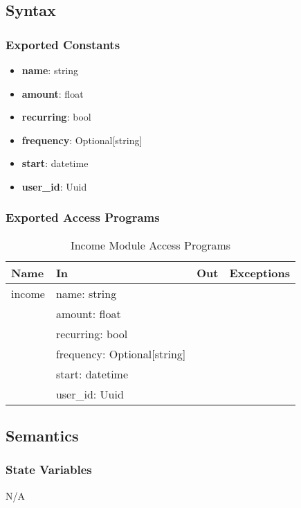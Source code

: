 \documentclass[12pt, titlepage]{article}
\begin{document}
\subsection{Syntax}

\subsubsection{Exported Constants}
\begin{itemize}
  \item \textbf{name}: string
  \item \textbf{amount}: float
  \item \textbf{recurring}: bool
  \item \textbf{frequency}: Optional[string]
  \item \textbf{start}: datetime
  \item \textbf{user\_id}: Uuid
\end{itemize}

\subsubsection{Exported Access Programs}

\begin{center}
  \begin{table}[H]
    \caption{Income Module Access Programs}
\begin{tabular}{p{4cm} p{4cm} p{4cm} p{4cm}}
\hline
\textbf{Name} & \textbf{In} & \textbf{Out} & \textbf{Exceptions} \\
\hline
income & name: string &  &  \\
  & amount: float &  &  \\
  & recurring: bool &  &  \\
  & frequency: Optional[string] &  &  \\
  & start: datetime &  &  \\
  & user\_id: Uuid &  &  \\
\hline
\end{tabular}
\end{table}
\end{center}

\subsection{Semantics}

\subsubsection{State Variables}
N/A
\end{document}
